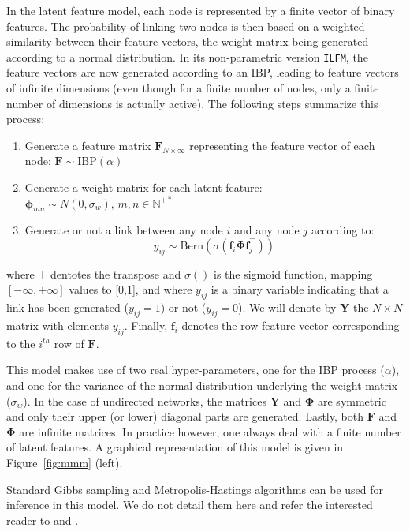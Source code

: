 \documentclass[journal]{IEEEtran}
\newcommand{\ifm}{\texttt{ILFM}}
\newcommand{\IBP}{\mathrm{IBP}}
\newcommand{\mat}[1]{\mathbf{#1}}
\begin{document}
In the latent feature model, each node is represented by a finite vector of binary features. The probability of linking two nodes is then based on a weighted similarity between their feature vectors, the weight matrix being generated according to a normal distribution. In its non-parametric version \ifm, the feature vectors are now generated according to an IBP, leading to feature vectors of infinite dimensions (even though for a finite number of nodes, only a finite number of dimensions is actually active). The following steps summarize this process:
%
\begin{enumerate}
\item Generate a feature matrix $\mat{F}_{N \times \infty}$ representing the feature vector of each node: $\mat{F} \sim \IBP(\alpha)$
\item Generate a weight matrix for each latent feature:\\
 $\mat{\phi}_{mn} \sim N(0, \sigma_w), \, m,n \in \mathbb{N}^{+*}$
\item Generate or not a link between any node $i$ and any node $j$ according to: 
%
\begin{equation}
y_{ij} \sim \mathrm{Bern}(\sigma(\mat{f}_{i} \mat{\Phi} \mat{f}_{j}^\top))
\label{eq:link-ilfm}
\end{equation}
\end{enumerate}
%
where $\top$ dentotes the transpose and  $\sigma()$ is the sigmoid function, mapping $[-\infty, +\infty]$ values to [0,1], and where $y_{ij}$ is a binary variable indicating that a link has been generated ($y_{ij}=1$) or not ($y_{ij}=0$). We will denote by $\mat{Y}$ the $N \times N$ matrix with elements $y_{ij}$. Finally, $\mat{f}_{i}$ denotes the row feature vector corresponding to the $i^{th}$ row of $\mat{F}$.

This model makes use of two real hyper-parameters, one for the IBP process ($\alpha$), and one for the variance of the normal distribution underlying the weight matrix ($\sigma_w$). In the case of undirected networks, the matrices $\mat{Y}$ and $\mat{\Phi}$ are symmetric and only their upper (or lower) diagonal parts are generated. Lastly, both $\mat{F}$ and $\mat{\Phi}$ are infinite matrices. In practice however, one always deal with a finite number of latent features. A graphical representation of this model is given in Figure~\ref{fig:mmm} (left).

Standard Gibbs sampling and Metropolis-Hastings algorithms can be used for inference in this model. We do not detail them here and refer the interested reader to \cite{ILFRM} and \cite{IBP}.
\end{document}
